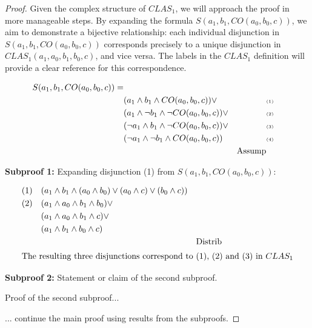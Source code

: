 \documentclass{article}
\begin{document}
\begin{proof}
	
	Given the complex structure of $CLAS_1$, we will approach the proof in more manageable steps. By expanding the formula $ S(a_1, b_1, CO(a_0, b_0, c)) $, we aim to demonstrate a bijective relationship: each individual disjunction in  $ S(a_1, b_1, CO(a_0, b_0, c)) $ corresponds precisely to a unique disjunction in $ CLAS_1(a_1, a_0, b_1, b_0, c) $, and vice versa. The labels in the $ CLAS_1 $ definition will provide a clear reference for this correspondence.
	
	\begin{align*}
		S(a_1, b_1, CO(a_0, b_0, c)) = \\ 
		& (a_1 \land b_1 \land CO(a_0, b_0, c)) \lor && \text{\tiny (1)} \\ 
		& (a_1 \land \lnot b_1 \land \lnot CO(a_0, b_0, c)) \lor && \text{\tiny (2)} \\ 
		& (\lnot a_1 \land b_1 \land \lnot CO(a_0, b_0, c)) \lor && \text{\tiny (3)} \\
		& (\lnot a_1 \land \lnot b_1 \land CO(a_0, b_0, c))  && \text{\tiny (4)} \\ 
		&& \text{Assump}
	\end{align*}
	
	\textbf{Subproof 1:}  Expanding disjunction (1)  from $S(a_1, b_1, CO(a_0, b_0, c))$:
	
	\begin{align*}
		(1)  & \quad (a_1 \land b_1 \land (a_0 \land b_0) \lor (a_0 \land c) \lor (b_0 \land c) ) \\
		(2)  & \quad  (a_1 \land a_0 \land b_1   \land b_0) \lor \\
			   & \quad (a_1 \land a_0 \land b_1   \land c) \lor \\
			   & \quad (a_1 \land b_1  \land b_0 \land c)  \\
			   && \text{Distrib} \\	
			   \intertext{The resulting three  disjunctions correspond to (1), (2) and (3) in $CLAS_1$}
	\end{align*}
	
	\textbf{Subproof 2:} Statement or claim of the second subproof.
	
	Proof of the second subproof...
	
	... continue the main proof using results from the subproofs.
	
\end{proof}
\end{document}
